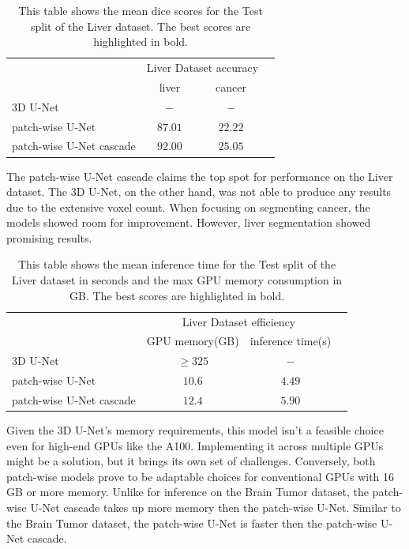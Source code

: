 \begin{table}[ht!]
\begin{center} {\footnotesize
\begin{tabular}{lccc}
\hline
	& \multicolumn{2}{c}{Liver Dataset accuracy} \\
	& \multicolumn{1}{c}{liver} & \multicolumn{1}{c}{cancer} \\
\hline
3D U-Net & $-$ & $-$ \\[1ex]
patch-wise U-Net & $87.01$ & $22.22$ \\[1ex]
patch-wise U-Net cascade & $\mathbf{92.00}$ & $\mathbf{25.05}$ \\[1ex]
\hline
\end{tabular} }
\end{center}
\caption{\footnotesize This table shows the mean dice scores for the Test split of the Liver dataset. The best scores are highlighted in bold.}
\label{turns}
\end{table}

\noindent The patch-wise U-Net cascade claims the top spot for performance on the Liver dataset. The 3D U-Net, on the other hand, was not able to produce any results due to the extensive voxel count.
When focusing on segmenting cancer, the models showed room for improvement. However, liver segmentation showed promising results.

\begin{table}[ht!]
\begin{center} {\footnotesize
\begin{tabular}{lccc}
\hline
	& \multicolumn{2}{c}{Liver Dataset efficiency} \\
	& \multicolumn{1}{c}{GPU memory(GB)} & \multicolumn{1}{c}{inference time(s)} \\
\hline
3D U-Net & $\geq325$ & $-$ \\[1ex]
patch-wise U-Net & $\mathbf{10.6}$ & $\mathbf{4.49}$ \\[1ex]
patch-wise U-Net cascade & $12.4$ & $5.90$\\[1ex]
\hline
\end{tabular} }
\end{center}
\caption{\footnotesize This table shows the mean inference time for the Test split of the Liver dataset in seconds and the max GPU memory consumption in GB. The best scores are highlighted in bold.}
\label{turns}
\end{table}

\noindent Given the 3D U-Net's memory requirements,
this model isn't a feasible choice even for high-end GPUs like the A100. Implementing it across multiple GPUs might be a solution, but it brings its own set of challenges.
Conversely, both patch-wise models prove to be adaptable choices for conventional GPUs with 16 GB or more memory. Unlike for inference on the Brain Tumor dataset,
the patch-wise U-Net cascade takes up more memory then the patch-wise U-Net. Similar to the Brain Tumor dataset, the patch-wise U-Net is faster then the patch-wise U-Net cascade.


